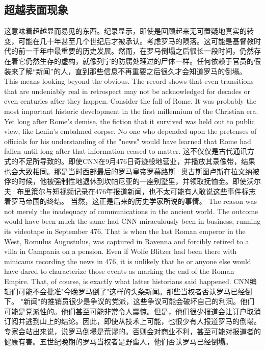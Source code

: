 \subsection{超越表面现象}
\begin{paracol}{2}
这意味着超越显而易见的东西。纪录显示，即使是回顾起来无可置疑地真实的转变，可能在几十年甚至几个世纪后才被承认。考虑罗马的陨落。这可能是基督教时代的前一千年中最重要的历史发展。然而，在罗马倒塌之后很长一段时间，仍然存在着它仍然生存的虚构，就像列宁的防腐处理过的尸体一样。任何依赖于官员的假装来了解“新闻”的人，直到那些信息不再重要之后很久才会知道罗马的倒塌。
\switchcolumn
This means looking beyond the obvious. The record shows that even transitions that are undeniably real in retrospect may not be acknowledged for decades or even centuries after they happen. Consider the fall of Rome. It was probably the most important historic development in the first millennium of the Christian era. Yet long after Rome's demise, the fiction that it survived was held out to public view, like Lenin's embalmed corpse. No one who depended upon the pretenses of officials for his understanding of the "news" would have learned that Rome had fallen until long after that information ceased to matter.  
\switchcolumn*
这不仅仅是古代通讯方式的不足所导致的。即使CNN在9月476日奇迹般地营业，并播放其录像带，结果也会大致相同。那是当时西部最后的罗马皇帝罗慕路斯·奥古斯图卢斯在拉文纳被俘的时候，他被强制性地退休到坎帕尼亚的一座别墅里，并领取抚恤金。即使沃尔夫·布里策尔与短视频记录在476年报道新闻，也不太可能有人敢说这些事件标志着罗马帝国的终结。 当然，这正是后来的历史学家所说的事情。
\switchcolumn
The reason was not merely the inadequacy of communications in the ancient world. The outcome would have been much the same had CNN miraculously been in business, running its videotape in September 476. That is when the last Roman emperor in the West, Romulus Augustulus, was captured in Ravenna and forcibly retired to a villa in Campania on a pension. Even if Wolfe Blitzer had been there with minicams recording the news in 476, it is unlikely that he or anyone else would have dared to characterize those events as marking the end of the Roman Empire. That, of course, is exactly what latter historians said happened.
\switchcolumn*
CNN编辑们可能不会批准"今晚罗马倒了"这样的头条新闻。那些当权者否认罗马已经倒下。 "新闻"的推销员很少是争议的党派，这些争议可能会破坏自己的利润。他们可能是党派性的。他们甚至可能非常令人震惊。但是，他们很少报道会让订户取消订阅并逃到山上的结论。因此，即使从技术上可能，也很少有人报道罗马的倒塌。专家会站出来说，说罗马倒塌是荒谬的。否则会对商业不利，甚至可能对报道者的健康有害。五世纪晚期的罗马当权者是野蛮人，他们否认罗马已经倒塌。

\end{paracol}

